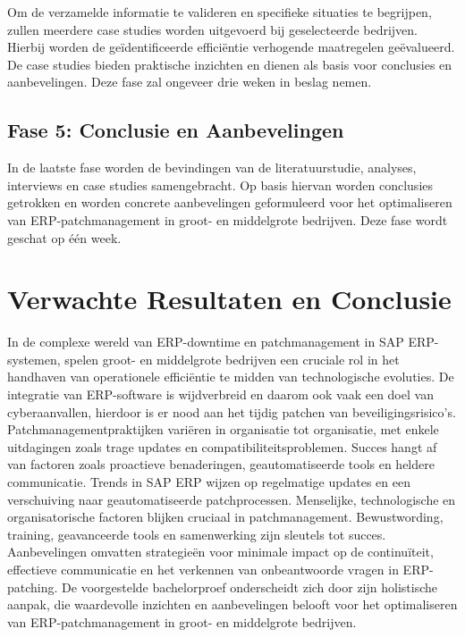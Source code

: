 Om de verzamelde informatie te valideren en specifieke situaties te begrijpen, zullen meerdere case studies worden uitgevoerd bij geselecteerde bedrijven. Hierbij worden de geïdentificeerde efficiëntie verhogende maatregelen geëvalueerd. De case studies bieden praktische inzichten en dienen als basis voor conclusies en aanbevelingen. Deze fase zal ongeveer drie weken in beslag nemen.

\subsection{Fase 5: Conclusie en Aanbevelingen}

In de laatste fase worden de bevindingen van de literatuurstudie, analyses, interviews en case studies samengebracht. Op basis hiervan worden conclusies getrokken en worden concrete aanbevelingen geformuleerd voor het optimaliseren van ERP-patchmanagement in groot- en middelgrote bedrijven. Deze fase wordt geschat op één week.
  

\section{Verwachte Resultaten en Conclusie}%
\label{sec:verwachte-resultaten}

In de complexe wereld van ERP-downtime en patchmanagement in SAP ERP-systemen, spelen groot- en middelgrote bedrijven een cruciale rol in het handhaven van operationele efficiëntie te midden van technologische evoluties. De integratie van ERP-software is wijdverbreid en daarom ook vaak een doel van cyberaanvallen, hierdoor is er nood aan het tijdig patchen van beveiligingsrisico’s. 
Patchmanagementpraktijken variëren in organisatie tot organisatie, met enkele uitdagingen zoals trage updates en compatibiliteitsproblemen. Succes hangt af van factoren zoals proactieve benaderingen, geautomatiseerde tools en heldere communicatie.
Trends in SAP ERP wijzen op regelmatige updates en een verschuiving naar geautomatiseerde patchprocessen. Menselijke, technologische en organisatorische factoren blijken cruciaal in patchmanagement. Bewustwording, training, geavanceerde tools en samenwerking zijn sleutels tot succes. Aanbevelingen omvatten strategieën voor minimale impact op de continuïteit, effectieve communicatie en het verkennen van onbeantwoorde vragen in ERP-patching.
De voorgestelde bachelorproef onderscheidt zich door zijn holistische aanpak, die waardevolle inzichten en aanbevelingen belooft voor het optimaliseren van ERP-patchmanagement in groot- en middelgrote bedrijven.
